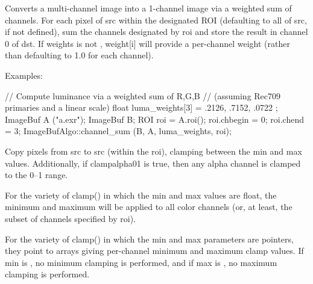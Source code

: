  
Converts a multi-channel image into a 1-channel image via a weighted sum
of channels.  For each pixel of {\cf src} within the designated ROI
(defaulting to all of {\cf src}, if not defined), sum the channels
designated by {\cf roi} and store the result in channel 0 of {\cf dst}.
If {\cf weights} is not \NULL, {\cf weight[i]} will provide a
per-channel weight (rather than defaulting to 1.0 for each channel).

\smallskip
\noindent Examples:
\begin{code}
    // Compute luminance via a weighted sum of R,G,B
    // (assuming Rec709 primaries and a linear scale)
    float luma_weights[3] = { .2126, .7152, .0722 };
    ImageBuf A ("a.exr");
    ImageBuf B;
    ROI roi = A.roi();
    roi.chbegin = 0;  roi.chend = 3;
    ImageBufAlgo::channel_sum (B, A, luma_weights, roi);
\end{code}
\apiend


 

Copy pixels from {\cf src} to {\cf src} (within the {\cf roi}), clamping
between the {\cf min} and {\cf max} values.  Additionally, if
{\cf clampalpha01} is {\cf true}, then any alpha 
channel is clamped to the 0--1 range.

For the variety of {\cf clamp()} in which the {\cf min} and {\cf max}
values are {\cf float}, the minimum and maximum will be applied to
all color channels (or, at least, the subset of channels specified by
{\cf roi}).

For the variety of {\cf clamp()} in which the {\cf min} and {\cf max}
parameters are pointers, they point to arrays giving per-channel minimum
and maximum clamp values.  If {\cf min} is \NULL, no minimum clamping is
performed, and if {\cf max} is \NULL, no maximum clamping is performed.


